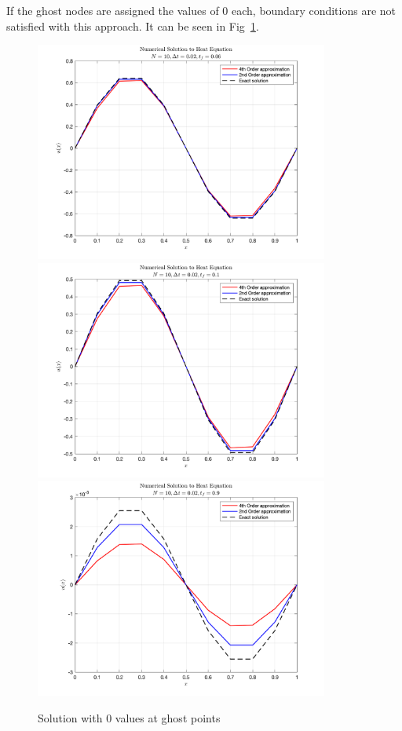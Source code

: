 \documentclass[11pt]{article}
\begin{document}
\begin{enumerate}
\begin{enumerate}
      If the ghost nodes are assigned the values of 0 each, boundary conditions are not satisfied with this approach. It can be seen in Fig~\ref{fig:q3c}. 
      
      \begin{figure}[htp]
      \begin{center}
      \includegraphics[width=3.8in]{q3c_1} \\
      \includegraphics[width=3.8in]{q3c_2} \\
      \includegraphics[width=3.8in]{q3c_3}  
      \caption{Solution with 0 values at ghost points}
      \label{fig:q3c}
      \end{center}
      \end{figure}
      

\end{enumerate}
\end{enumerate}
\end{document}
